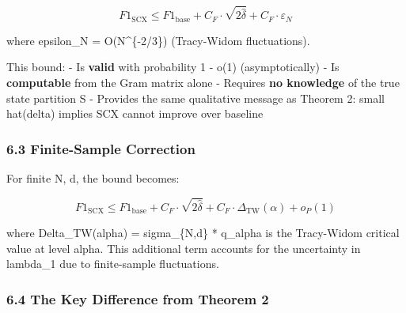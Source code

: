 \documentclass[
  12pt,
]{article}
\begin{document}
\[F1_{\text{SCX}} \leq F1_{\text{base}} + C_F \cdot \sqrt{2\hat{\delta}} + C_F \cdot \varepsilon_N\]

where epsilon\_N = O(N\^{}\{-2/3\}) (Tracy-Widom fluctuations).

This bound: - Is \textbf{valid} with probability 1 - o(1)
(asymptotically) - Is \textbf{computable} from the Gram matrix alone -
Requires \textbf{no knowledge} of the true state partition S - Provides
the same qualitative message as Theorem 2: small hat(delta) implies SCX
cannot improve over baseline

\subsubsection{6.3 Finite-Sample
Correction}\label{finite-sample-correction}

For finite N, d, the bound becomes:

\[F1_{\text{SCX}} \leq F1_{\text{base}} + C_F \cdot \sqrt{2\hat{\delta}} + C_F \cdot \Delta_{\text{TW}}(\alpha) + o_P(1)\]

where Delta\_TW(alpha) = sigma\_\{N,d\} * q\_alpha is the Tracy-Widom
critical value at level alpha. This additional term accounts for the
uncertainty in lambda\_1 due to finite-sample fluctuations.

\subsubsection{6.4 The Key Difference from Theorem
2}\label{the-key-difference-from-theorem-2}
\end{document}
